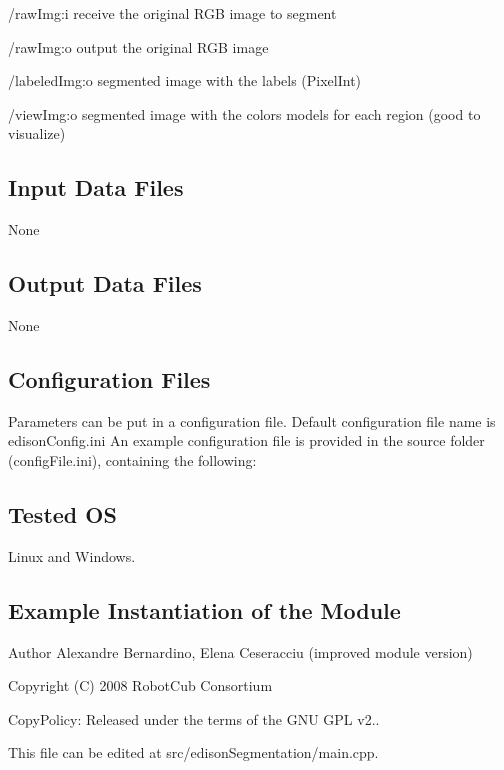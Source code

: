 /raw\+Img\+:i receive the original R\+GB image to segment

/raw\+Img\+:o output the original R\+GB image

/labeled\+Img\+:o segmented image with the labels (Pixel\+Int)

/view\+Img\+:o segmented image with the colors models for each region (good to visualize)\hypertarget{group__lumaChroma_in_files_sec}{}\subsection{Input Data Files}\label{group__lumaChroma_in_files_sec}
None\hypertarget{group__lumaChroma_out_data_sec}{}\subsection{Output Data Files}\label{group__lumaChroma_out_data_sec}
None\hypertarget{group__lumaChroma_conf_file_sec}{}\subsection{Configuration Files}\label{group__lumaChroma_conf_file_sec}
Parameters can be put in a configuration file. Default configuration file name is edison\+Config.\+ini An example configuration file is provided in the source folder (config\+File.\+ini), containing the following\+: 
\begin{DoxyCode}{0}
\end{DoxyCode}
\hypertarget{group__blobExtractor_tested_os_sec}{}\subsection{Tested OS}\label{group__blobExtractor_tested_os_sec}
Linux and Windows.\hypertarget{group__lumaChroma_example_sec}{}\subsection{Example Instantiation of the Module}\label{group__lumaChroma_example_sec}

\begin{DoxyCode}{0}
\end{DoxyCode}


\begin{DoxyAuthor}{Author}
Alexandre Bernardino, Elena Ceseracciu (improved module version)
\end{DoxyAuthor}
Copyright (C) 2008 Robot\+Cub Consortium

Copy\+Policy\+: Released under the terms of the G\+NU G\+PL v2..

This file can be edited at src/edison\+Segmentation/main.\+cpp. 